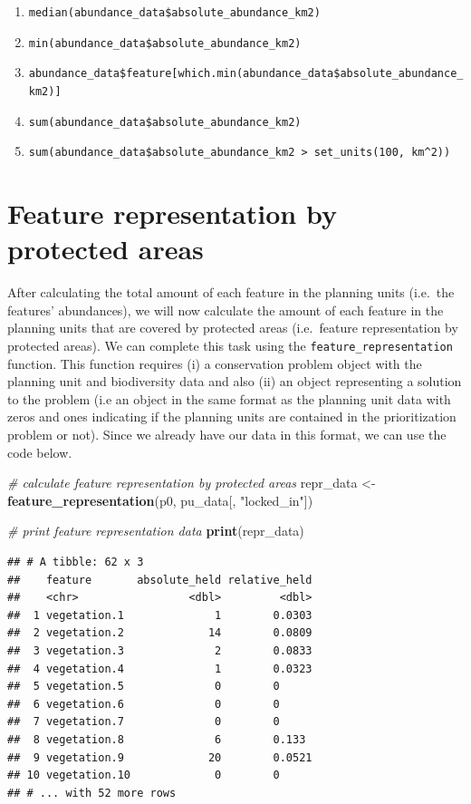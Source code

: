 \documentclass[12pt,]{book}
\newenvironment{Shaded}{\begin{snugshade}}{\end{snugshade}}
\newcommand{\KeywordTok}[1]{\textcolor[rgb]{0.13,0.29,0.53}{\textbf{#1}}}
\newcommand{\StringTok}[1]{\textcolor[rgb]{0.31,0.60,0.02}{#1}}
\newcommand{\CommentTok}[1]{\textcolor[rgb]{0.56,0.35,0.01}{\textit{#1}}}
\newcommand{\NormalTok}[1]{#1}
\providecommand{\tightlist}{%
  \setlength{\itemsep}{0pt}\setlength{\parskip}{0pt}}
\let\BeginKnitrBlock\begin \let\EndKnitrBlock\end
\begin{document}
\BeginKnitrBlock{rmdanswer}
\begin{enumerate}
\def\labelenumi{\arabic{enumi}.}
\tightlist
\item
  \texttt{median(abundance\_data\$absolute\_abundance\_km2)}
\item
  \texttt{min(abundance\_data\$absolute\_abundance\_km2)}
\item
  \texttt{abundance\_data\$feature{[}which.min(abundance\_data\$absolute\_abundance\_km2){]}}
\item
  \texttt{sum(abundance\_data\$absolute\_abundance\_km2)}
\item
  \texttt{sum(abundance\_data\$absolute\_abundance\_km2\ \textgreater{}\ set\_units(100,\ km\^{}2))}
\end{enumerate}
\EndKnitrBlock{rmdanswer}

\section{Feature representation by protected
areas}\label{feature-representation-by-protected-areas}

After calculating the total amount of each feature in the planning units
(i.e.~the features' abundances), we will now calculate the amount of
each feature in the planning units that are covered by protected areas
(i.e.~feature representation by protected areas). We can complete this
task using the \texttt{feature\_representation} function. This function
requires (i) a conservation problem object with the planning unit and
biodiversity data and also (ii) an object representing a solution to the
problem (i.e an object in the same format as the planning unit data with
zeros and ones indicating if the planning units are contained in the
prioritization problem or not). Since we already have our data in this
format, we can use the code below.

\begin{Shaded}
\begin{Highlighting}[]
\CommentTok{# calculate feature representation by protected areas}
\NormalTok{repr_data <-}\StringTok{ }\KeywordTok{feature_representation}\NormalTok{(p0, pu_data[, }\StringTok{"locked_in"}\NormalTok{])}

\CommentTok{# print feature representation data}
\KeywordTok{print}\NormalTok{(repr_data)}
\end{Highlighting}
\end{Shaded}

\begin{verbatim}
## # A tibble: 62 x 3
##    feature       absolute_held relative_held
##    <chr>                 <dbl>         <dbl>
##  1 vegetation.1              1        0.0303
##  2 vegetation.2             14        0.0809
##  3 vegetation.3              2        0.0833
##  4 vegetation.4              1        0.0323
##  5 vegetation.5              0        0     
##  6 vegetation.6              0        0     
##  7 vegetation.7              0        0     
##  8 vegetation.8              6        0.133 
##  9 vegetation.9             20        0.0521
## 10 vegetation.10             0        0     
## # ... with 52 more rows
\end{verbatim}
\end{document}
